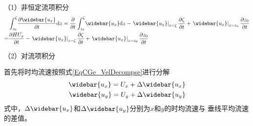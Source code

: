 （1）非恒定流项积分
\begin{equation}
    \begin{aligned}
    &
    \int_{z_0}^{\zeta}\!
    \frac{\partial \widebar{u_{x}}}{\partial t} 
    \mathrm{d}z
    =
    \frac{\partial}{\partial t}
    \int_{z_0}^{\zeta}\!
    \widebar{u_{x}}
    \mathrm{d}z
    -
    \left.\widebar{u_{x}}\right|_{z=\zeta}\frac{\partial \zeta}{\partial t}
    +
    \left.\widebar{u_{x}}\right|_{z=z_{0}}\frac{\partial z_{0}}{\partial t}
        \\
        =&
    \frac{\partial HU_{x}}{\partial t}
    -
    \left.\widebar{u_{x}}\right|_{z=\zeta}\frac{\partial \zeta}{\partial t}
    +
    \left.\widebar{u_{x}}\right|_{z=z_{0}}\frac{\partial z_{0}}{\partial t}
    \end{aligned}
        \label{EqCGe_Mex_US_Int}
\end{equation}

（2）对流项积分

首先将时均流速按照式\eqref{EqCGe_VelDecompse}进行分解
\begin{equation}
\begin{aligned}
\widebar{u_{x}}
=
U_{x}+\Delta\widebar{u_{x}}
\\
\widebar{u_{y}}
=
U_{y}+\Delta\widebar{u_{y}}
\end{aligned}
\label{EqCGe_VelDecompse}
\end{equation}
式中，$\Delta\widebar{u_{x}}$和$\Delta\widebar{u_{y}}$分别为$x$和$y$的时均流速与
垂线平均流速的差值。

